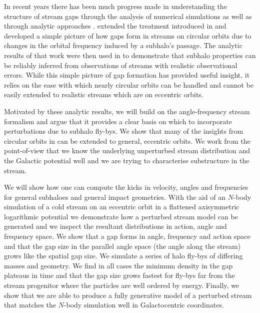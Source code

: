 \documentclass[useAMS,usenatbib,fleqn,a4paper]{mn2e}
\begin{document}
In recent years there has been much progress made in understanding the structure of stream gaps through the analysis of numerical simulations \citep{Johnston2002,Ibata2002,SiegalGaskins2008,Carlberg2009,YoonJohnstonHogg,Carlberg2012} as well as through analytic approaches \citep{Carlberg2013,ErkalBelokurov2015,ErkalBelokurov2015b}. \cite{ErkalBelokurov2015} extended the treatment introduced in \cite{Carlberg2013} and developed a simple picture of how gaps form in streams on circular orbits due to changes in the orbital frequency induced by a subhalo's passage. The analytic results of that work were then used in \citet{ErkalBelokurov2015b} to demonstrate that subhalo properties can be reliably inferred from observations of streams with realistic observational errors. While this simple picture of gap formation has provided useful insight, it relies on the ease with which nearly circular orbits can be handled and cannot be easily extended to realistic streams which are on eccentric orbits.

Motivated by these analytic results, we will build on the angle-frequency stream formalism and argue that it provides a clear basis on which to incorporate perturbations due to subhalo fly-bys. We show that many of the insights from circular orbits in \cite{ErkalBelokurov2015} can be extended to general, eccentric orbits. We work from the point-of-view that we know the underlying unperturbed stream distribution and the Galactic potential well and we are trying to characterise substructure in the stream.

We will show how one can compute the kicks in velocity, angles and frequencies for general subhaloes and general impact geometries. With the aid of an $N$-body simulation of a cold stream on an eccentric orbit in a flattened axisymmetric logarithmic potential we demonstrate how a perturbed stream model can be generated and we inspect the resultant distributions in action, angle and frequency space. We show that a gap forms in angle, frequency and action space and that the gap size in the parallel angle space (the angle along the stream) grows like the spatial gap size. We simulate a series of halo fly-bys of differing masses and geometry. We find in all cases the minimum density in the gap plateaus in time and that the gap size grows fastest for fly-bys far from the stream progenitor where the particles are well ordered by energy. Finally, we show that we are able to produce a fully generative model of a perturbed stream that matches the $N$-body simulation well in Galactocentric coordinates.
\end{document}
